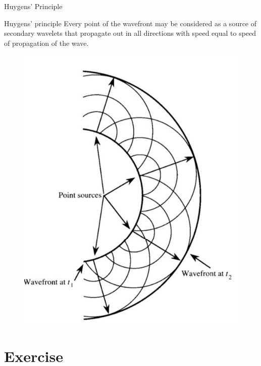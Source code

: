 \documentclass{beamer}
\begin{document}
\begin{frame}{Huygens' Principle}
    \begin{block}{Huygens' principle}
        Every point of the wavefront may be considered as a source of secondary wavelets that propagate out in all directions with speed equal to speed of propagation of the wave.
    \end{block}

    \begin{figure}[htbp]
        \centering
        \includegraphics[height=0.5\textheight]{Images/huygens.jpg}
    \end{figure}
\end{frame}


\section{Exercise}
\end{document}
